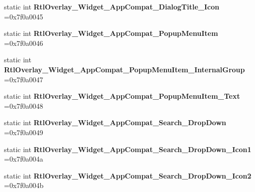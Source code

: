 \begin{DoxyCompactItemize}
static int {\bfseries Rtl\+Overlay\+\_\+\+Widget\+\_\+\+App\+Compat\+\_\+\+Dialog\+Title\+\_\+\+Icon} =0x7f0a0045
\item 
\mbox{\label{classandroid_1_1support_1_1graphics_1_1drawable_1_1R_1_1style_a9c42dcf516b24ca894d2c251fb8e2e7c}} 
static int {\bfseries Rtl\+Overlay\+\_\+\+Widget\+\_\+\+App\+Compat\+\_\+\+Popup\+Menu\+Item} =0x7f0a0046
\item 
\mbox{\label{classandroid_1_1support_1_1graphics_1_1drawable_1_1R_1_1style_a19aa3bfce8d0447b7587c4a857c16122}} 
static int {\bfseries Rtl\+Overlay\+\_\+\+Widget\+\_\+\+App\+Compat\+\_\+\+Popup\+Menu\+Item\+\_\+\+Internal\+Group} =0x7f0a0047
\item 
\mbox{\label{classandroid_1_1support_1_1graphics_1_1drawable_1_1R_1_1style_a2bda4aa45a3bedefb5a33632f40f4c3e}} 
static int {\bfseries Rtl\+Overlay\+\_\+\+Widget\+\_\+\+App\+Compat\+\_\+\+Popup\+Menu\+Item\+\_\+\+Text} =0x7f0a0048
\item 
\mbox{\label{classandroid_1_1support_1_1graphics_1_1drawable_1_1R_1_1style_ad3706121dc08eb9b07ad84a6b07643eb}} 
static int {\bfseries Rtl\+Overlay\+\_\+\+Widget\+\_\+\+App\+Compat\+\_\+\+Search\+\_\+\+Drop\+Down} =0x7f0a0049
\item 
\mbox{\label{classandroid_1_1support_1_1graphics_1_1drawable_1_1R_1_1style_aa70e9fadd5ca1048d35156400d53a241}} 
static int {\bfseries Rtl\+Overlay\+\_\+\+Widget\+\_\+\+App\+Compat\+\_\+\+Search\+\_\+\+Drop\+Down\+\_\+\+Icon1} =0x7f0a004a
\item 
\mbox{\label{classandroid_1_1support_1_1graphics_1_1drawable_1_1R_1_1style_a88e934872e1a664652f7b75026d39a71}} 
static int {\bfseries Rtl\+Overlay\+\_\+\+Widget\+\_\+\+App\+Compat\+\_\+\+Search\+\_\+\+Drop\+Down\+\_\+\+Icon2} =0x7f0a004b
\item 
\mbox{\label{classandroid_1_1support_1_1graphics_1_1drawable_1_1R_1_1style_ac7b9e02571f3b1ec47d71590aaf0fda9}} 

\end{DoxyCompactItemize}
